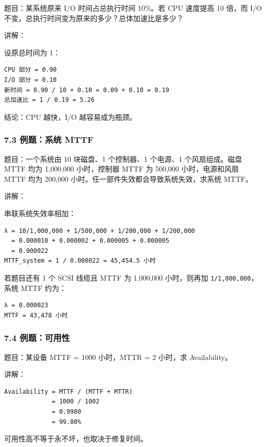 \documentclass[
]{ctexart}
\newcommand{\passthrough}[1]{#1}
\begin{document}
题目：某系统原来 I/O 时间占总执行时间 10\%。若 CPU 速度提高 10 倍，而
I/O 不变，总执行时间变为原来的多少？总体加速比是多少？

讲解：

设原总时间为 1：

\begin{lstlisting}
CPU 部分 = 0.90
I/O 部分 = 0.10
新时间 = 0.90 / 10 + 0.10 = 0.09 + 0.10 = 0.19
总加速比 = 1 / 0.19 = 5.26
\end{lstlisting}

结论：CPU 越快，I/O 越容易成为瓶颈。

\subsubsection{7.3 例题：系统 MTTF}\label{ux4f8bux9898ux7cfbux7edf-mttf}

题目：一个系统由 10 块磁盘、1 个控制器、1 个电源、1 个风扇组成。磁盘
MTTF 均为 1,000,000 小时，控制器 MTTF 为 500,000 小时，电源和风扇 MTTF
均为 200,000 小时。任一部件失效都会导致系统失效，求系统 MTTF。

讲解：

串联系统失效率相加：

\begin{lstlisting}
λ = 10/1,000,000 + 1/500,000 + 1/200,000 + 1/200,000
  = 0.000010 + 0.000002 + 0.000005 + 0.000005
  = 0.000022
MTTF_system = 1 / 0.000022 = 45,454.5 小时
\end{lstlisting}

若题目还有 1 个 SCSI 线缆且 MTTF 为 1,000,000 小时，则再加
\passthrough{\lstinline!1/1,000,000!}，系统 MTTF 约为：

\begin{lstlisting}
λ = 0.000023
MTTF = 43,478 小时
\end{lstlisting}

\subsubsection{7.4 例题：可用性}\label{ux4f8bux9898ux53efux7528ux6027}

题目：某设备 MTTF = 1000 小时，MTTR = 2 小时，求 Availability。

讲解：

\begin{lstlisting}
Availability = MTTF / (MTTF + MTTR)
             = 1000 / 1002
             = 0.9980
             = 99.80%
\end{lstlisting}

可用性高不等于永不坏，也取决于修复时间。
\end{document}
